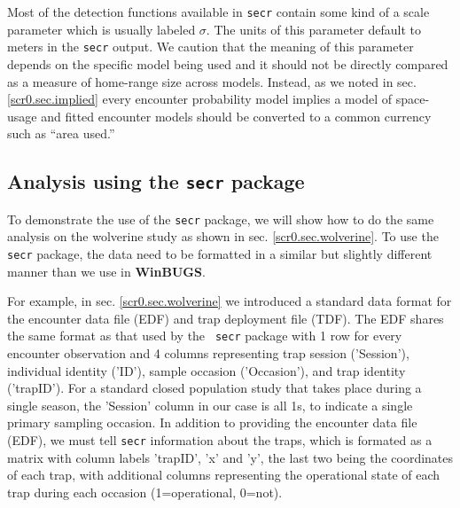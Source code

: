 Most of the detection functions available in \mbox{\tt secr} contain
some kind of a scale parameter which is usually labeled $\sigma$.  The
units of this parameter default to meters in the \mbox{\tt secr}
output.  We caution that the meaning of this parameter depends on the
specific model being used and it should not be directly compared as a
measure of home-range size across models. Instead, as we noted in
sec. \ref{scr0.sec.implied} every encounter probability model implies
a model of space-usage and fitted encounter models should be converted
to a common currency such as ``area used.''


\subsection{Analysis using the \mbox{\tt secr} package}
\label{mle.sec.wolvsecr}

To demonstrate the use of the \mbox{\tt secr} package, we will show
how to do the same analysis on the wolverine study as shown in
sec. \ref{scr0.sec.wolverine}. To use the \mbox{\tt secr} package, the
data need to be formatted in a similar but slightly different manner
than we use in {\bf WinBUGS}.

For example, in sec. \ref{scr0.sec.wolverine} we introduced a standard
data format for the encounter data file (EDF) and trap deployment file
(TDF). The EDF shares the same format as that used by the \mbox{\tt
  secr} package with 1 row for every encounter observation and 4
columns representing trap session ('Session'), individual identity
('ID'), sample occasion ('Occasion'), and trap identity ('trapID').
For a standard closed population study that takes place during a
single season, the 'Session' column in our case is all 1s, to indicate
a single primary sampling occasion.  In addition to providing the
encounter data file (EDF), we must tell \mbox{\tt secr} information
about the traps, which is formated as a matrix with column labels
'trapID', 'x' and 'y', the last two being the coordinates of each
trap, with additional columns representing the operational state of
each trap during each occasion (1=operational, 0=not).

